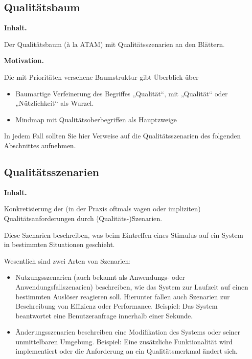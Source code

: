\documentclass[]{article}
\begin{document}
\hypertarget{_qualit_tsbaum}{%
\subsection{Qualitätsbaum}\label{_qualit_tsbaum}}

\textbf{Inhalt.}

Der Qualitätsbaum (à la ATAM) mit Qualitätsszenarien an den Blättern.

\textbf{Motivation.}

Die mit Prioritäten versehene Baumstruktur gibt Überblick über

\begin{itemize}
\item
  Baumartige Verfeinerung des Begriffes „Qualität``, mit „Qualität``
  oder „Nützlichkeit`` als Wurzel.
\item
  Mindmap mit Qualitätsoberbegriffen als Hauptzweige
\end{itemize}

In jedem Fall sollten Sie hier Verweise auf die Qualitätsszenarien des
folgenden Abschnittes aufnehmen.

\hypertarget{_qualit_tsszenarien}{%
\subsection{Qualitätsszenarien}\label{_qualit_tsszenarien}}

\textbf{Inhalt.}

Konkretisierung der (in der Praxis oftmals vagen oder impliziten)
Qualitätsanforderungen durch (Qualitäts-)Szenarien.

Diese Szenarien beschreiben, was beim Eintreffen eines Stimulus auf ein
System in bestimmten Situationen geschieht.

Wesentlich sind zwei Arten von Szenarien:

\begin{itemize}
\item
  Nutzungsszenarien (auch bekannt als Anwendungs- oder
  Anwendungsfallszenarien) beschreiben, wie das System zur Laufzeit auf
  einen bestimmten Auslöser reagieren soll. Hierunter fallen auch
  Szenarien zur Beschreibung von Effizienz oder Performance. Beispiel:
  Das System beantwortet eine Benutzeranfrage innerhalb einer Sekunde.
\item
  Änderungsszenarien beschreiben eine Modifikation des Systems oder
  seiner unmittelbaren Umgebung. Beispiel: Eine zusätzliche
  Funktionalität wird implementiert oder die Anforderung an ein
  Qualitätsmerkmal ändert sich.
\end{itemize}
\end{document}
